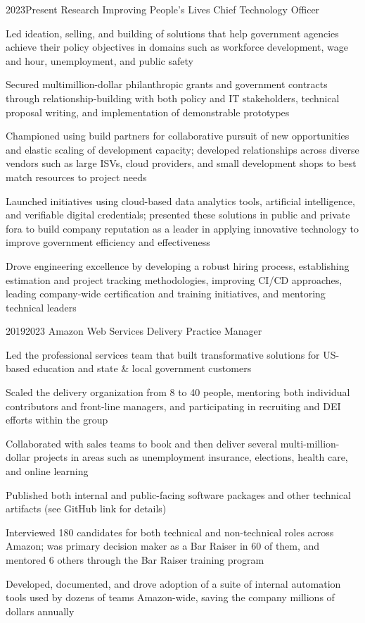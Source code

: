 \job
  {2023}{Present}
  {Research Improving People's Lives}
  {Chief Technology Officer}
  {\begin{achievements}
    \item Led ideation, selling, and building of solutions that help government agencies achieve their policy objectives in domains such as workforce development, wage and hour, unemployment, and public safety
    \item Secured multimillion-dollar philanthropic grants and government contracts through relationship-building with both policy and IT stakeholders, technical proposal writing, and implementation of demonstrable prototypes
    \item Championed using build partners for collaborative pursuit of new opportunities and elastic scaling of development capacity; developed relationships across diverse vendors such as large ISVs, cloud providers, and small development shops to best match resources to project needs
    \item Launched initiatives using cloud-based data analytics tools, artificial intelligence, and verifiable digital credentials; presented these solutions in public and private fora to build company reputation as a leader in applying innovative technology to improve government efficiency and effectiveness
    \item Drove engineering excellence by developing a robust hiring process, establishing estimation and project tracking methodologies, improving CI/CD approaches, leading company-wide certification and training initiatives, and mentoring technical leaders
  \end{achievements}}

\job
  {2019}{2023}
  {Amazon Web Services}
  {Delivery Practice Manager}
  {\begin{achievements}
    \item Led the professional services team that built transformative solutions for US-based education and state \& local government customers
    \item Scaled the delivery organization from 8 to 40 people, mentoring both individual contributors and front-line managers, and participating in recruiting and DEI efforts within the group
    \item Collaborated with sales teams to book and then deliver several multi-million-dollar projects in areas such as unemployment insurance, elections, health care, and online learning
    \item Published both internal and public-facing software packages and other technical artifacts (see GitHub link for details)
    \item Interviewed 180 candidates for both technical and non-technical roles across Amazon; was primary decision maker as a Bar Raiser in 60 of them, and mentored 6 others through the Bar Raiser training program
    \item Developed, documented, and drove adoption of a suite of internal automation tools used by dozens of teams Amazon-wide, saving the company millions of dollars annually
  \end{achievements}}

